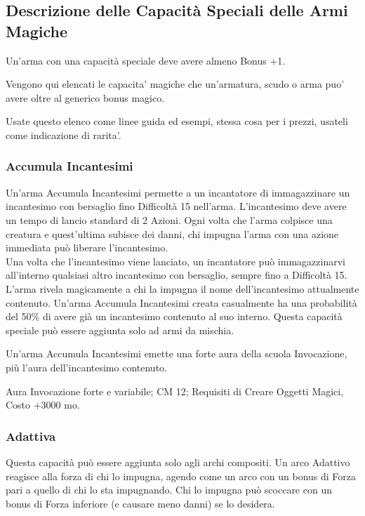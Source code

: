 \subsection{Descrizione delle Capacità Speciali delle Armi Magiche}

Un'arma con una capacità speciale deve avere almeno Bonus +1.

Vengono qui elencati le capacita' magiche che un'armatura, scudo o arma puo' avere oltre al generico bonus magico.

Usate questo elenco come linee guida ed esempi, stessa cosa per i prezzi, usateli come indicazione di rarita'.

\begin{multicols}{2}

\subsubsection{Accumula Incantesimi}

Un'arma Accumula Incantesimi permette a un incantatore di immagazzinare un incantesimo con bersaglio fino Difficoltà 15 nell'arma. L'incantesimo deve avere un tempo di lancio standard di 2 Azioni. Ogni volta che l'arma colpisce una creatura e quest'ultima subisce dei danni, chi impugna l'arma con una azione immediata può liberare l'incantesimo.\\
Una volta che l'incantesimo viene lanciato, un incantatore può immagazzinarvi all'interno qualsiasi altro incantesimo con bersaglio, sempre fino a Difficoltà 15.\\
L'arma rivela magicamente a chi la impugna il nome dell'incantesimo attualmente contenuto. Un'arma Accumula Incantesimi creata casualmente ha una probabilità del 50\% di avere già un incantesimo contenuto al suo interno. Questa capacità speciale può essere aggiunta solo ad armi da mischia.

Un'arma Accumula Incantesimi emette una forte aura della scuola Invocazione, più l'aura dell'incantesimo contenuto.

Aura Invocazione forte e variabile; CM 12; Requisiti di Creare Oggetti Magici, Costo +3000 mo.

\subsubsection{Adattiva}

Questa capacità può essere aggiunta solo agli archi compositi. Un arco Adattivo reagisce alla forza di chi lo impugna, agendo come un arco con un bonus di Forza pari a quello di chi lo sta impugnando. Chi lo impugna può scoccare con un bonus di Forza inferiore (e causare meno danni) se lo desidera.


\end{multicols}
